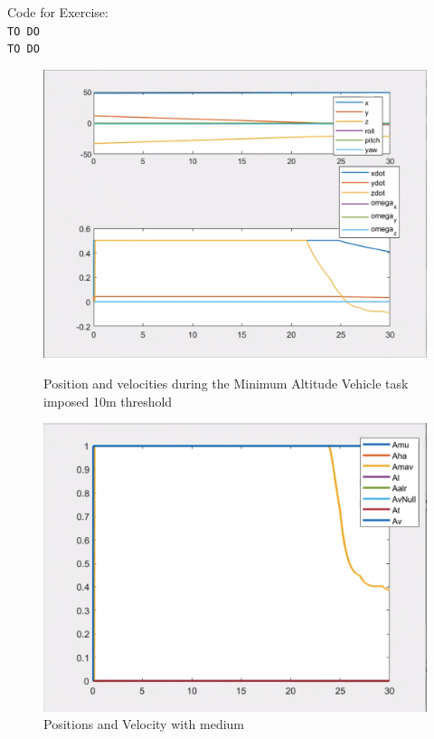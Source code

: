 \documentclass{article}
\begin{document}
\colorbox{mygray}{\parbox{0.9\textwidth}{Code for Exercise: \\
\texttt{TO DO}\\
\texttt{TO DO}
}}

\begin{figure}[htpb] 
\begin{minipage}{0.40\textwidth}  
\includegraphics[width=\textwidth]{123_10m_ppdot.png}
\caption{Position and velocities during the Minimum Altitude Vehicle task imposed 10m threshold}\label{10m_ppdot} 
\end{minipage}  
\hspace{0.2\textwidth} 
\begin{minipage}{0.43\textwidth}  
\includegraphics[width=\textwidth]{123_10m_A.png}
\caption{Positions and Velocity with medium}\label{10m_A} 
\end{minipage} 
\end{figure}
\end{document}
